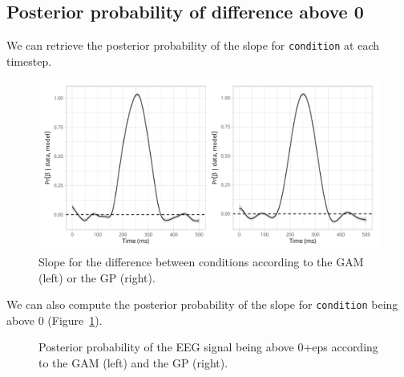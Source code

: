 \documentclass[
  doc,
  floatsintext,
  longtable,
  a4paper,
  nolmodern,
  notxfonts,
  notimes,
  colorlinks=true,linkcolor=blue,citecolor=blue,urlcolor=blue]{apa7}
\begin{document}
\subsection{Posterior probability of difference above
0}\label{posterior-probability-of-difference-above-0}

We can retrieve the posterior probability of the slope for
\texttt{condition} at each timestep.

\begin{figure}[H]

\caption{Slope for the difference between conditions according to the
GAM (left) or the GP (right).}

{\centering \includegraphics[width=1\textwidth,height=\textheight]{brms_meeg_files/figure-pdf/unnamed-chunk-1-1.pdf}

}

\end{figure}%

We can also compute the posterior probability of the slope for
\texttt{condition} being above 0 (Figure~\ref{fig-post-prob-test}).

\begin{figure}[!htb]

\caption{\label{fig-post-prob-test}Posterior probability of the EEG
signal being above 0+eps according to the GAM (left) and the GP
(right).}


\end{figure}%
\end{document}
